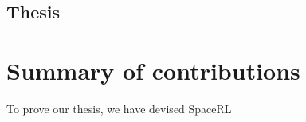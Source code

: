 \subsection{Thesis}





\section{Summary of contributions}\label{sec:intro-summary}
To prove our thesis, we have devised SpaceRL %

    
